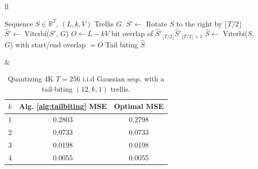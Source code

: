 \begin{table}[t]
\vspace{-0.1cm}
\begin{tabular}{ll}
\centering
\begin{minipage}{0.48\textwidth}
\begin{algorithm}[H]
\caption{Tail-biting Trellis Approx.}
\begin{algorithmic}
\INPUT Sequence $S \in \mathbb{R}^T$, $(L, k, V)$ Trellis $G$.
\STATE $S' \gets $ Rotate $S$ to the right by $\lfloor T / 2 \rfloor$
\STATE $\hat S' \gets $ Viterbi($S'$, $G$)
\STATE $O \gets L-kV$ bit overlap of $\hat S'_{\lfloor T/2 \rfloor}\hat S'_{\lfloor T/2 \rfloor + 1}$
\STATE $\hat S \gets $ Viterbi($S$, $G$) with start/end overlap $= O$
\OUTPUT Tail biting $\hat S$
\end{algorithmic}
\label{alg:tailbiting}
\end{algorithm}
\end{minipage}
& 
\begin{minipage}{0.45\textwidth}
\centering
\caption{Quantizing 4K $T=256$ i.i.d Gaussian seqs. with a tail-biting $(12, k, 1)$ trellis.}
\vspace{-0.1cm}
\begin{tabular}{@{}ccc@{}}
\toprule
$k$ & Alg. \ref{alg:tailbiting} MSE & Optimal MSE \\ \midrule
1   & 0.2803           & 0.2798     \\
2   & 0.0733           & 0.0733     \\
3   & 0.0198           & 0.0198     \\
4   & 0.0055           & 0.0055     \\ \bottomrule
\end{tabular}
\label{tab:tailbiting}
\vspace{-0.4cm}
\end{minipage}
\end{tabular}
\end{table} 

